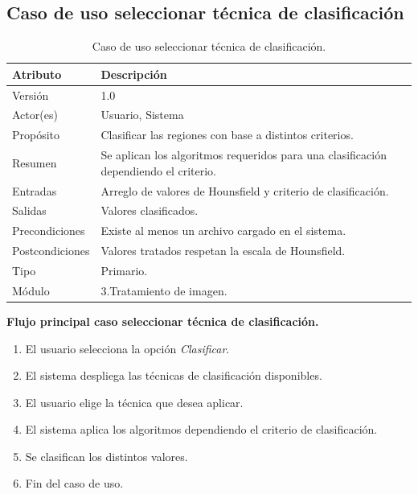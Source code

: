 \documentclass[12pt]{report}
\begin{document}
\subsection{Caso de uso seleccionar técnica de clasificación}
\begin{table}[H]
\begin{center}
\begin{tabular}{p{30mm}p{80mm}}
\hline
Atributo & Descripción\\
\hline \hline 
Versión & 1.0\\
Actor(es) & Usuario, Sistema\\
Propósito & Clasificar las regiones con base a distintos criterios.\\
Resumen & Se aplican los algoritmos requeridos para una clasificación dependiendo el criterio.\\
Entradas & Arreglo de valores de Hounsfield y criterio de clasificación.\\
Salidas & Valores clasificados.\\
Precondiciones & Existe al menos un archivo cargado en el sistema.\\
Postcondiciones & Valores tratados respetan la escala de Hounsfield.\\
Tipo & Primario.\\
Módulo & 3.Tratamiento de imagen.\\
\hline \hline
\end{tabular}
\caption{Caso de uso seleccionar técnica de clasificación.}
\end{center}
\end{table}

\textbf{Flujo principal caso seleccionar técnica de clasificación. }
\begin{enumerate}
\item El usuario selecciona la opción \textit{Clasificar}.
\item El sistema despliega las técnicas de clasificación disponibles.
\item El usuario elige la técnica que desea aplicar.
\item El sistema aplica los algoritmos dependiendo el criterio de clasificación.
\item Se clasifican los distintos valores.
\item Fin del caso de uso.
\end{enumerate}
\end{document}
